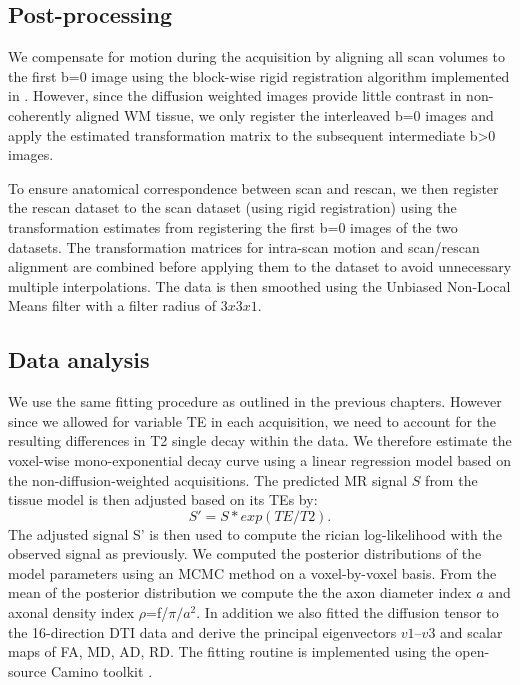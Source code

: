\subsection*{Post-processing}
We compensate for motion during the acquisition by aligning all scan volumes to the first b=0 image using the block-wise rigid registration algorithm \citep{XX} implemented in \citep{niftyreg}. However, since the diffusion weighted images provide little contrast in non-coherently aligned WM tissue, we only register the interleaved b=0 images and apply the estimated transformation matrix to the subsequent intermediate b>0 images.   

To ensure anatomical correspondence between scan and rescan, we then register the rescan dataset to the scan dataset (using rigid registration) using the transformation estimates from registering  the first b=0 images of the two datasets. The transformation matrices for intra-scan motion and scan/rescan alignment are combined before applying them to the dataset to avoid unnecessary multiple interpolations. The data is then smoothed using the Unbiased Non-Local Means filter \citep{Aja-Fernandez:2010} with a filter radius of $3x3x1$.

\subsection*{Data analysis}
We use the same fitting procedure as outlined in the previous chapters. However since we allowed for variable TE in each acquisition, we need to account for the resulting differences in T2 single decay within the data. We therefore estimate the voxel-wise mono-exponential decay curve using a linear regression model based on the non-diffusion-weighted acquisitions. The predicted MR signal $S$ from the tissue model is then adjusted based on its \glspl{TE} by:
\begin{equation}
	S' = S * exp(TE/T2).
\end{equation}
The adjusted signal S' is then used to compute the rician log-likelihood with the observed signal as previously. We computed the posterior distributions of the model parameters using an MCMC method on a voxel-by-voxel basis. From the mean of the posterior distribution we compute the the axon diameter index $a$ and axonal density index $\rho$=f/$\pi/a^2$. In addition we also fitted the diffusion tensor to the 16-direction DTI data and derive the principal eigenvectors $v1$--$v3$ and scalar maps of FA, MD, AD, RD. The fitting routine is implemented using the open-source Camino toolkit \citep{Cook:2006}.
